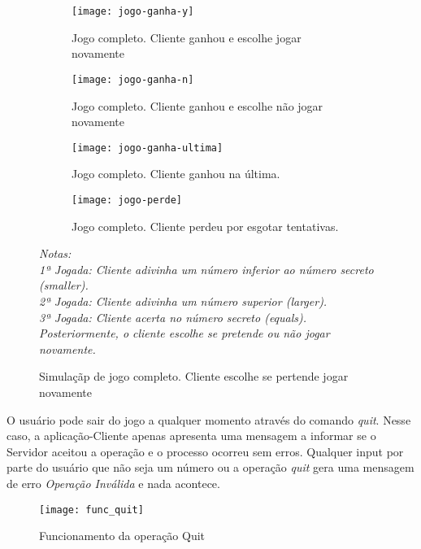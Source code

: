 \begin{figure}[H]
	\centering
	\begin{subfigure}[t]{0.45\textwidth}
		\centering
		\texttt{[image: jogo-ganha-y]}
		\caption{Jogo completo. Cliente ganhou e escolhe jogar novamente}
		\label{fig:jogo-ganha-y}
	\end{subfigure}
	\begin{subfigure}[t]{0.45\textwidth}
		\centering
		\texttt{[image: jogo-ganha-n]}
		\caption{Jogo completo. Cliente ganhou e escolhe não jogar novamente}
		\label{fig:jogo-ganha-n}
	\end{subfigure}	
	\begin{subfigure}[t]{0.45\textwidth}
		\centering
		\texttt{[image: jogo-ganha-ultima]}
		\caption{Jogo completo. Cliente ganhou na última.}
		\label{fig:jogo-ganha-ultima}
	\end{subfigure}
	\begin{subfigure}[t]{0.45\textwidth}
		\centering
		\texttt{[image: jogo-perde]}
		\caption{Jogo completo. Cliente perdeu por esgotar tentativas.}
		\label{fig:jogo-perde}
	\end{subfigure}
	\caption{Simulaçãp de jogo completo. Cliente escolhe se pertende jogar novamente}
	\label{fig:jogo-ganha-perde}
	\flushleft\small\textit{Notas: \\ 1ª Jogada: Cliente adivinha um número inferior ao número secreto (\textit{smaller}). \\ 2ª Jogada: Cliente adivinha um número superior (\textit{larger}). \\ 3ª Jogada: Cliente acerta no número secreto (\textit{equals}). \\ Posteriormente, o cliente escolhe se pretende ou não jogar novamente. }
\end{figure}	

O usuário pode sair do jogo a qualquer momento através do comando \textit{quit}. Nesse caso, a aplicação-Cliente apenas apresenta uma mensagem a informar se o Servidor aceitou a operação e o processo ocorreu sem erros. Qualquer input por parte do usuário que não seja um número ou a operação \textit{quit} gera uma mensagem de erro \textit{Operação Inválida} e nada acontece.

\begin{figure}[H]
	\centering
	\texttt{[image: func\_quit]}
	\caption{Funcionamento da operação Quit\\}
	\label{fig:func_quit}
\end{figure} 

